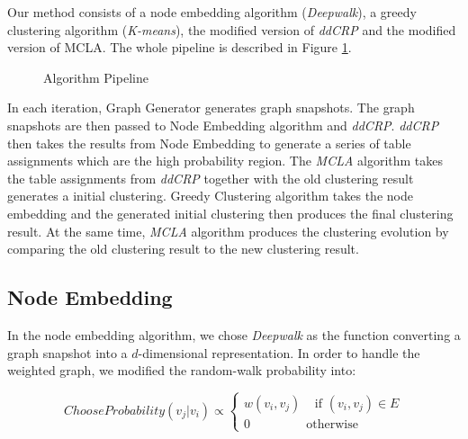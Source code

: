 
Our method consists of a node embedding algorithm (\emph{Deepwalk}), a greedy clustering algorithm (\emph{K-means}), the modified version of \emph{ddCRP} and the modified version of MCLA. The whole pipeline is described in Figure \ref{fig:pipeline}.

\begin{figure}
    \centering
    \caption{Algorithm Pipeline}
    \label{fig:pipeline}
\end{figure}

In each iteration, Graph Generator generates graph snapshots. The graph snapshots are then passed to Node Embedding algorithm and \emph{ddCRP}. \emph{ddCRP} then takes the results from Node Embedding to generate a series of table assignments which are the high probability region. The \emph{MCLA} algorithm takes the table assignments from \emph{ddCRP} together with the old clustering result generates a initial clustering. Greedy Clustering algorithm takes the node embedding and the generated initial clustering then produces the final clustering result. At the same time, \emph{MCLA} algorithm produces the clustering evolution by comparing the old clustering result to the new clustering result.



\newpage
\subsection{Node Embedding}

In the node embedding algorithm, we chose \emph{Deepwalk} as the function converting a graph snapshot into a $d$-dimensional representation. In order to handle the weighted graph, we modified the random-walk probability into:

\begin{equation}
    ChooseProbability(v_j | v_i) \propto \left\{
        \begin{array}{ll}
            w(v_i, v_j) \;\;\;\; \text{if $(v_i, v_j) \in E$}\\
            0 \;\;\;\;\;\;\;\;\;\;\;\;\;\;\;\; \text{otherwise}
        \end{array}
    \right.
\end{equation}

